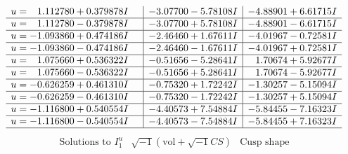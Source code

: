 \documentclass[1p]{elsarticle_modified}
\theoremstyle{definition}
\newcommand{\I}{\sqrt{-1}}
\begin{document}
$$\begin{array}{c|c|c}
\begin{aligned}
u &= \phantom{-}1.112780 + 0.379878 I\end{aligned}
 & -3.07700 - 5.78108 I & -4.88901 + 6.61715 I \\ \hline\begin{aligned}
u &= \phantom{-}1.112780 - 0.379878 I\end{aligned}
 & -3.07700 + 5.78108 I & -4.88901 - 6.61715 I \\ \hline\begin{aligned}
u &= -1.093860 + 0.474186 I\end{aligned}
 & -2.46460 + 1.67611 I & -4.01967 - 0.72581 I \\ \hline\begin{aligned}
u &= -1.093860 - 0.474186 I\end{aligned}
 & -2.46460 - 1.67611 I & -4.01967 + 0.72581 I \\ \hline\begin{aligned}
u &= \phantom{-}1.075660 + 0.536322 I\end{aligned}
 & -0.51656 - 5.28641 I & \phantom{-}1.70674 + 5.92677 I \\ \hline\begin{aligned}
u &= \phantom{-}1.075660 - 0.536322 I\end{aligned}
 & -0.51656 + 5.28641 I & \phantom{-}1.70674 - 5.92677 I \\ \hline\begin{aligned}
u &= -0.626259 + 0.461310 I\end{aligned}
 & -0.75320 + 1.72242 I & -1.30257 - 5.15094 I \\ \hline\begin{aligned}
u &= -0.626259 - 0.461310 I\end{aligned}
 & -0.75320 - 1.72242 I & -1.30257 + 5.15094 I \\ \hline\begin{aligned}
u &= -1.116800 + 0.540554 I\end{aligned}
 & -4.40573 + 7.54884 I & -5.84455 - 7.16323 I \\ \hline\begin{aligned}
u &= -1.116800 - 0.540554 I\end{aligned}
 & -4.40573 - 7.54884 I & -5.84455 + 7.16323 I\\
 \hline 
 \end{array}$$\newpage$$\begin{array}{c|c|c}  
\text{Solutions to }I^u_{1}& \I (\text{vol} + \sqrt{-1}CS) & \text{Cusp shape}\\
 \hline 
\begin{aligned}

\end{aligned}
\end{array}$$
\end{document}
